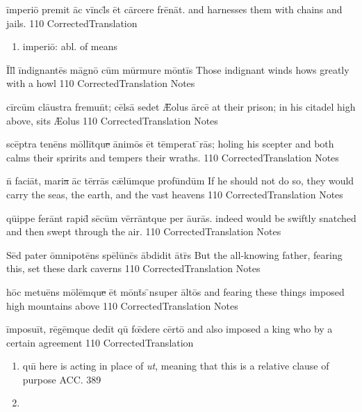 \latline
  {\=imp\-er\-i\={\macron o} pr\-em\-it \=ac v\=incl\={\macron {\i}}s \=et c\=arc\-er\-e fr\={\macron e}n\=at.
}
  { and harnesses them with chains and jails. }
  {110}
  { CorrectedTranslation }
  { \begin{enumerate}
  	\item imperi\={o}:  abl. of means
  \end{enumerate} }


\latline
  {\=Ill\={\macron {\i}} \=ind\-ign\-ant\={\macron e}s m\=agn\={\macron o} c\=um m\=urm\-ur\-e m\=ont\=is
}
  { Those indignant winds hows greatly with a howl }
  {110}
  { CorrectedTranslation }
  { Notes }


\latline
  {c\=irc\=um cl\={au}str\-a fr\-emu\=nt; c\=els\={\macron a} s\-ed\-et \={\AE}\-ol\-us \=arc\=e
}
  { at their prison; in his citadel high above, sits {\AE}olus }
  {110}
  { CorrectedTranslation }
  { Notes }


\latline
  {sc\={\macron e}ptr\-a t\-en\={\macron e}ns m\=oll\=itqu\sout{e }\=anim\={\macron o}s \=et t\=emp\-er\-at \={\macron {\i}}r\={\macron a}s;
}
  { holing his scepter and both calms their spririts and tempers their wraths. }
  {110}
  { CorrectedTranslation }
  { Notes }


\latline
  {n\={\macron {\i}} f\-ac\-i\=at, m\-ar\-i\sout{a }\=ac t\=err\={\macron a}s c\={\ae}l\=umqu\-e pr\-of\=und\=um
}
  { If he should not do so, they would carry the seas, the earth, and the vast heavens }
  {110}
  { CorrectedTranslation }
  { Notes }


\latline
  {q\={ui}pp\-e f\-er\=ant r\-ap\-id\={\macron {\i}} s\={\macron e}c\=um v\=err\=antqu\-e p\-er \={au}r\={\macron a}s.
}
  { indeed would be swiftly snatched and then swept through the air. }
  {110}
  { CorrectedTranslation }
  { Notes }


\latline
  {S\=ed p\-at\-er \=omn\-ip\-ot\={\macron e}ns sp\={\macron e}l\=unc\={\macron {\i}}s \=abd\-id\-it \={\macron a}tr\={\macron {\i}}s
}
  { But the all-knowing father, fearing this, set these dark caverns }
  {110}
  { CorrectedTranslation }
  { Notes }


\latline
  {h\=oc m\-et\-u\={\macron e}ns m\={\macron o}l\=emqu\sout{e }\=et m\=ont\={\macron {\i}}s \={\macron {\i}}ns\-upe\-r \=alt\={\macron o}s
}
  { and fearing these things imposed high mountains above }
  {110}
  { CorrectedTranslation }
  { Notes }


\latline
  {\=imp\-os\-u\=it, r\={\macron e}g\=emqu\-e d\-ed\=it qu\={\macron {\i}} f\={\oe}d\-er\-e c\=ert\={\macron o}
}
  { and also imposed a king who by a certain agreement }
  {110}
  { CorrectedTranslation }
  { \begin{enumerate}
  	\item qu\={\i} here is acting in place of \emph{ut}, meaning that this is a relative clause of purpose ACC. 389
  	\item 
  \end{enumerate} }


